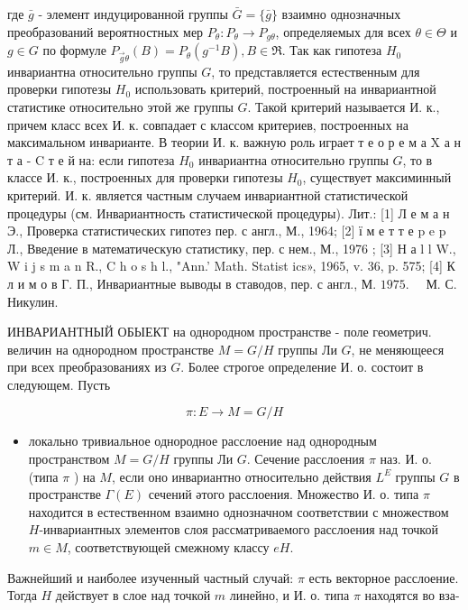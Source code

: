 \documentclass[10pt]{article}
\begin{document}
где $\bar{g}$ - элемент индуцированной группы $\bar{G}=\{\bar{g}\}$ взаимно однозначных преобразований вероятностных мер $P_{\theta}: P_{\theta} \rightarrow P_{g \theta}$, определяемых для всех $\theta \in \Theta$ и $g \in G$ по формуле $P_{\vec{g} \theta}(B)=P_{\theta}\left(g^{-1} B\right), B \in \Re$. Так как гипотеза $H_{0}$ инвариантна относительно группы $G$, то представляется естественным для проверки гипотезы $H_{0}$ использовать критерий, построенный на инвариантной статистике относительно этой же группы $G$. Такой критерий называется И. к., причем класс всех И. к. совпадает с классом критериев, построенных на максимальном инварианте. В теории И. к. важную роль играет т е о р е м а X а н т а - $\mathrm{C}$ т е й на: если гипотеза $H_{0}$ инвариантна относительно группы $G$, то в классе И. к., построенных для проверки гипотезы $H_{0}$, существует максиминный критерий. И. к. является частным случаем инвариантной статистической процедуры (см. Инвариантность статистической процедуры). Лит.: [1] Л е м а н Э., Проверка статистических гипотез пер. с англ., М., 1964; [2] ї м е т т е p e p Л., Введение в математическую статистику, пер. с нем., М., 1976 ; [3] Н а l l W., W i j s m a n R., C h o s h l., "Ann.' Math. Statist ics», 1965, v. 36, p. 575; [4] К л и м о в Г. П., Инвариантные выводы в ставодов, пер. с англ., М. $1975 . \quad$ М. С. Никулин.



ИНВАРИАНТНЫЙ ОБЫЕКТ на однородном пространстве - поле геометрич. величин на однородном пространстве $M=G / H$ группы Ли $G$, не меняющееся при всех преобразованиях из $G$. Более строгое определение И. о. состоит в следующем. Пусть



\[

\pi: E \rightarrow M=G / H

\]



\begin{itemize}

  \item локально тривиальное однородное расслоение над однородным пространством $M=G / H$ группы Ли $G$. Сечение расслоения $\pi$ наз. И. о. (типа $\pi$ ) на $M$, если оно инвариантно относительно действия $L^{E}$ группы $G$ в пространстве $\Gamma(E)$ сечений әтого расслоения. Множество И. о. типа $\pi$ находится в естественном взаимно однозначном соответствии с множеством $H$-инвариантных элементов слоя рассматриваемого расслоения над точкой $m \in M$, соответствующей смежному классу $e H$.

\end{itemize}



Важнейший и наиболее изученный частный случай: $\pi$ есть векторное расслоение. Тогда $H$ действует в слое над точкой $m$ линейно, и И. о. типа $\pi$ находятся во вза-
\end{document}
